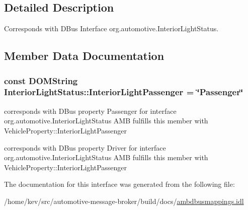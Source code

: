 \subsection{Detailed Description}
Corresponds with D\+Bus Interface org.\+automotive.\+Interior\+Light\+Status. 

\subsection{Member Data Documentation}
\hypertarget{interfaceInteriorLightStatus_abf8320eb6b0e7c6b60bbc90d91760832}{
\subsubsection[{Interior\+Light\+Passenger}]{\setlength{\rightskip}{0pt plus 5cm}const D\+O\+M\+String Interior\+Light\+Status\+::\+Interior\+Light\+Passenger = \char`\"{}Passenger\char`\"{}}}\label{interfaceInteriorLightStatus_abf8320eb6b0e7c6b60bbc90d91760832}


corresponds with D\+Bus property Passenger for interface org.\+automotive.\+Interior\+Light\+Status A\+M\+B fulfills this member with Vehicle\+Property\+::\+Interior\+Light\+Passenger 

corresponds with D\+Bus property Driver for interface org.\+automotive.\+Interior\+Light\+Status A\+M\+B fulfills this member with Vehicle\+Property\+::\+Interior\+Light\+Passenger 

The documentation for this interface was generated from the following file\+:\begin{DoxyCompactItemize}
\item 
/home/kev/src/automotive-\/message-\/broker/build/docs/\hyperlink{ambdbusmappings_8idl}{ambdbusmappings.\+idl}\end{DoxyCompactItemize}
